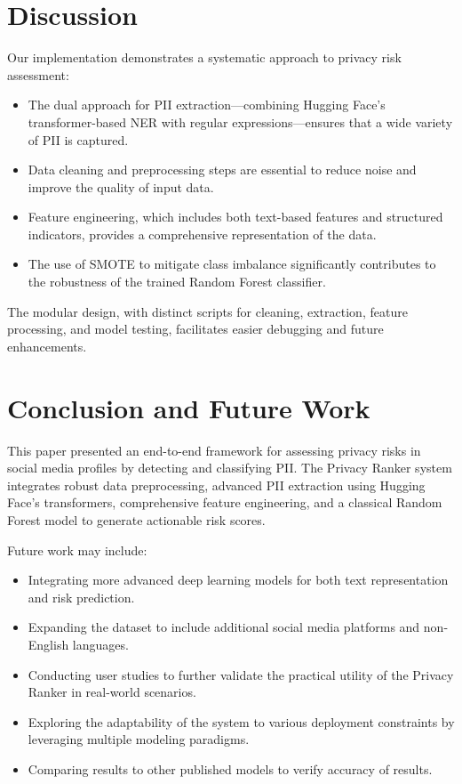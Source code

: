 \documentclass{article}
\begin{document}
\section{Discussion}
Our implementation demonstrates a systematic approach to privacy risk assessment:
\begin{itemize}
    \item The dual approach for PII extraction—combining Hugging Face’s transformer-based NER with regular expressions—ensures that a wide variety of PII is captured.
    \item Data cleaning and preprocessing steps are essential to reduce noise and improve the quality of input data.
    \item Feature engineering, which includes both text-based features and structured indicators, provides a comprehensive representation of the data.
    \item The use of SMOTE to mitigate class imbalance significantly contributes to the robustness of the trained Random Forest classifier.
\end{itemize}
The modular design, with distinct scripts for cleaning, extraction, feature processing, and model testing, facilitates easier debugging and future enhancements.

\section{Conclusion and Future Work}
This paper presented an end-to-end framework for assessing privacy risks in social media profiles by detecting and classifying PII. The Privacy Ranker system integrates robust data preprocessing, advanced PII extraction using Hugging Face’s transformers, comprehensive feature engineering, and a classical Random Forest model to generate actionable risk scores.

Future work may include:
\begin{itemize}
    \item Integrating more advanced deep learning models for both text representation and risk prediction.
    \item Expanding the dataset to include additional social media platforms and non-English languages.
    \item Conducting user studies to further validate the practical utility of the Privacy Ranker in real-world scenarios.
    \item Exploring the adaptability of the system to various deployment constraints by leveraging multiple modeling paradigms.
    \item Comparing results to other published models to verify accuracy of results.
\end{itemize}
\end{document}
